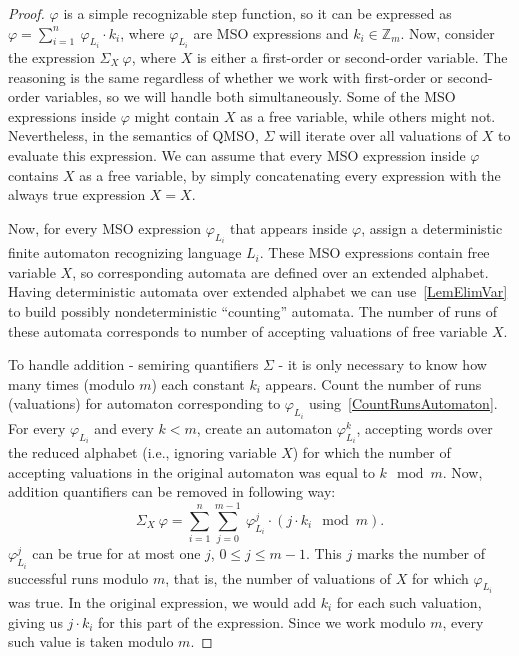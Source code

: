 \documentclass[12pt]{article}
\theoremstyle{definition}
\begin{document}
\begin{proof}
    $\varphi$ is a simple recognizable step function, so it can be expressed as $\varphi = \sum_{i = 1}^{n} \ \varphi_{L_i} \cdot k_i$, where $\varphi_{L_i}$ are MSO expressions and $k_i \in \mathbb{Z}_m$. Now, consider the expression $\Sigma_{X} \ \varphi$, where $X$ is either a first-order or second-order variable. The reasoning is the same regardless of whether we work with first-order or second-order variables, so we will handle both simultaneously. Some of the MSO expressions inside $\varphi$ might contain $X$ as a free variable, while others might not. Nevertheless, in the semantics of QMSO, $\Sigma$ will iterate over all valuations of $X$ to evaluate this expression. We can assume that every MSO expression inside $\varphi$ contains $X$ as a free variable, by simply concatenating every expression with the always true expression $X = X$.

    Now, for every MSO expression $\varphi_{L_i}$ that appears inside $\varphi$, assign a deterministic finite automaton recognizing language $L_i$. These MSO expressions contain free variable $X$, so corresponding automata are defined over an extended alphabet. Having deterministic automata over extended alphabet we can use~\cref{LemElimVar} to build possibly nondeterministic ``counting'' automata. The number of runs of these automata corresponds to number of accepting valuations of free variable $X$.

    To handle addition - semiring quantifiers $\Sigma$ - it is only necessary to know how many times (modulo $m$) each constant $k_i$ appears. Count the number of runs (valuations) for automaton corresponding to $\varphi_{L_i}$ using~\cref{CountRunsAutomaton}. For every $\varphi_{L_i}$ and every $k < m$, create an automaton $\varphi_{L_i}^k$, accepting words over the reduced alphabet (i.e., ignoring variable $X$) for which the number of accepting valuations in the original automaton was equal to $k \mod m$. Now, addition quantifiers can be removed in following way:
    $$\Sigma_X \ \varphi = \sum_{i = 1}^n \sum_{j = 0}^{m-1} \ \varphi_{L_i}^j \cdot (j \cdot k_i \mod m).$$
    $\varphi_{L_i}^j$ can be true for at most one $j$, $0 \leq j \leq m-1$. This $j$ marks the number of successful runs modulo $m$, that is, the number of valuations of $X$ for which $\varphi_{L_i}$ was true. In the original expression, we would add $k_i$ for each such valuation, giving us $j \cdot k_i$ for this part of the expression. Since we work modulo $m$, every such value is taken modulo $m$.
\end{proof}
\end{document}
